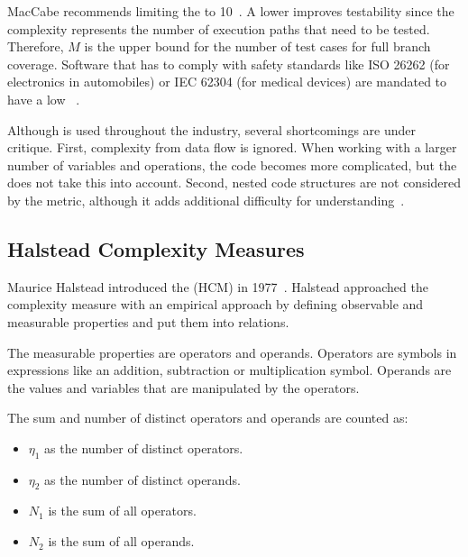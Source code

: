 MacCabe recommends limiting the  to 10~\cite{mccabe_complexity_1976}. A lower  improves testability since the complexity represents the number of execution paths that need to be tested. Therefore, $M$ is the upper bound for the number of test cases for full branch coverage. 
Software that has to comply with safety standards like ISO 26262 (for electronics in automobiles) or IEC 62304 (for medical devices) are mandated to have a low ~\cite{isotc_22sc_32_iso_2018, isotc_210_iec_2006}.

Although  is used throughout the industry, several shortcomings are under critique. First, complexity from data flow is ignored. When working with a larger number of variables and operations, the code becomes more complicated, but the  does not take this into account. Second, nested code structures are not considered by the metric, although it adds additional difficulty for understanding~\cite{yu_survey_2010}.

\subsection{Halstead Complexity Measures}
Maurice Halstead introduced the  (HCM) in 1977~\cite{halstead1977elements}. Halstead approached the complexity measure with an empirical approach by defining observable and measurable properties and put them into relations.

The measurable properties are operators and operands. Operators are symbols in expressions like an addition, subtraction or multiplication symbol. Operands are the values and variables that are manipulated by the operators. 

The sum and number of distinct operators and operands are counted as:
\begin{itemize}
    \item $\eta_1$ as the number of distinct operators.
    \item $\eta_2$ as the number of distinct operands.
    \item $N_1$ is the sum of all operators.
    \item $N_2$ is the sum of all operands. 
\end{itemize}

